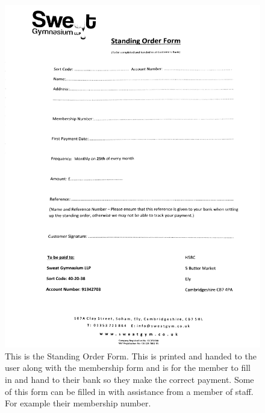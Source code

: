 \begin{figure}[H]
    \includegraphics[width=\textwidth]{StandingOrderForm,jpeg.jpg}
    \caption{This is the Standing Order Form. This is printed and handed to the user along with the membership form and is for the member to fill in and hand to their bank so they make the correct payment. Some of this form can be filled in with assistance from a member of staff. For example their membership number.} \label{fig:Standing Order Form }
\end{figure}

